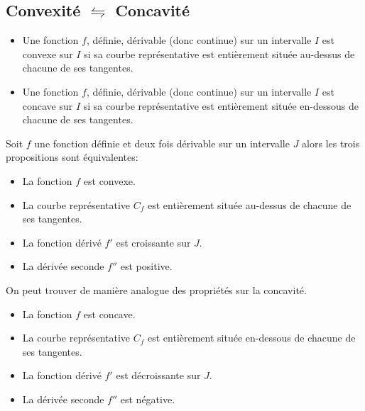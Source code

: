 \documentclass[french]{book}
\begin{document}
\subsection{Convexité $ \leftrightharpoons$ Concavité}

\begin{defn}
\begin{itemize}
\item[$\bullet$] Une fonction $f$, définie, dérivable (donc continue) sur un intervalle $I$ est convexe sur $I$ si sa courbe représentative est entièrement située au-dessus de chacune de ses tangentes.\\

\item[$\bullet$] Une fonction $f$, définie, dérivable (donc continue) sur un intervalle $I$ est concave sur $I$ si sa courbe représentative est entièrement située en-dessous de chacune de ses tangentes.
\end{itemize}
\end{defn}

\begin{prop}
Soit $f$ une fonction définie et deux fois dérivable sur un intervalle $J$ alors les trois propositions sont équivalentes: 

\begin{itemize}
\item[$\bullet$] La fonction $f$ est convexe.
\item[$\bullet$]  La courbe représentative $C_f$ est entièrement située au-dessus de chacune de ses tangentes.
\item[$\bullet$]  La fonction dérivé $f'$ est croissante sur $J$.
\item[$\bullet$] La dérivée seconde $f''$ est positive.
\end{itemize}

On peut trouver de manière analogue des propriétés sur la concavité.

\begin{itemize}
\item[$\bullet$] La fonction $f$ est concave.
\item[$\bullet$]  La courbe représentative $C_f$ est entièrement située en-dessous de chacune de ses tangentes.
\item[$\bullet$]  La fonction dérivé $f'$ est décroissante sur $J$.
\item[$\bullet$] La dérivée seconde $f''$ est négative.
\end{itemize}

\end{prop}
\end{document}
